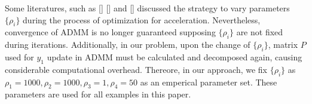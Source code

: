 \documentclass[annual]{acmsiggraph}
\begin{document}
Some literatures, such as [] [] and [] discussed the strategy to vary parameters $\{\rho_i\}$ during the process of optimization for acceleration. Nevertheless, convergence of ADMM is no longer guaranteed supposing $\{\rho_i\}$ are not fixed during iterations. Additionally, in our problem, upon the change of $\{\rho_i\}$, matrix $P$ used for $y_1$ update in ADMM must be calculated and decomposed again, causing considerable computational overhead. Thereore, in our approach, we fix $\{\rho_i\}$ as $\rho_1=1000, \rho_2=1000, \rho_3=1, \rho_4=50$ as an emperical parameter set. These parameters are used for all examples in this paper.


\end{document}
